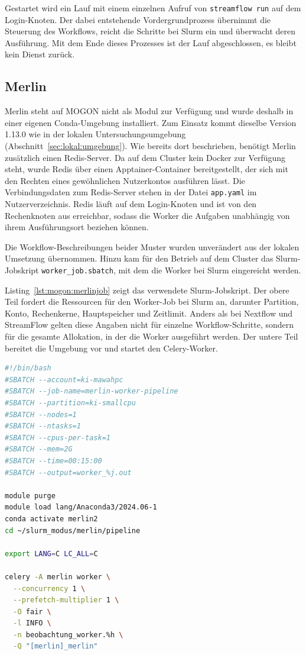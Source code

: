 Gestartet wird ein Lauf mit einem einzelnen Aufruf von
\texttt{streamflow run} auf dem Login-Knoten. Der dabei entstehende
Vordergrundprozess übernimmt die Steuerung des Workflows, reicht die
Schritte bei Slurm ein und überwacht deren Ausführung. Mit dem Ende
dieses Prozesses ist der Lauf abgeschlossen, es bleibt kein Dienst
zurück.

\subsection{Merlin}
\label{sec:mogon:merlin}

Merlin steht auf MOGON nicht als Modul zur Verfügung und wurde
deshalb in einer eigenen Conda-Umgebung installiert. Zum Einsatz
kommt dieselbe Version 1.13.0 wie in der lokalen
Untersuchungsumgebung (Abschnitt~\ref{sec:lokal:umgebung}). Wie
bereits dort beschrieben, benötigt Merlin zusätzlich einen
Redis-Server. Da auf dem Cluster kein Docker zur Verfügung steht,
wurde Redis über einen Apptainer-Container bereitgestellt, der sich
mit den Rechten eines gewöhnlichen Nutzerkontos ausführen lässt.
Die Verbindungsdaten zum Redis-Server stehen in der Datei
\texttt{app.yaml} im Nutzerverzeichnis. Redis läuft auf dem
Login-Knoten und ist von den Rechenknoten aus erreichbar, sodass die
Worker die Aufgaben unabhängig von ihrem Ausführungsort beziehen
können.

Die Workflow-Beschreibungen beider Muster wurden unverändert aus der
lokalen Umsetzung übernommen. Hinzu kam für den Betrieb auf dem
Cluster das Slurm-Jobskript \texttt{worker\_job.sbatch}, mit dem die
Worker bei Slurm eingereicht werden.

Listing~\ref{lst:mogon:merlinjob} zeigt das verwendete
Slurm-Jobskript. Der obere Teil fordert die Ressourcen für den
Worker-Job bei Slurm an, darunter Partition, Konto,
Rechenkerne, Hauptspeicher und Zeitlimit. Anders als bei Nextflow
und StreamFlow gelten diese Angaben nicht für einzelne
Workflow-Schritte, sondern für die gesamte Allokation, in der die
Worker ausgeführt werden. Der untere Teil bereitet die Umgebung vor
und startet den Celery-Worker.

\begin{lstlisting}[language=bash,
  caption={Jobskript zum Start der Merlin-Worker im regulären Slurm-Betrieb auf MOGON},
  label={lst:mogon:merlinjob}]
#!/bin/bash
#SBATCH --account=ki-mawahpc
#SBATCH --job-name=merlin-worker-pipeline
#SBATCH --partition=ki-smallcpu
#SBATCH --nodes=1
#SBATCH --ntasks=1
#SBATCH --cpus-per-task=1
#SBATCH --mem=2G
#SBATCH --time=00:15:00
#SBATCH --output=worker_%j.out

module purge
module load lang/Anaconda3/2024.06-1
conda activate merlin2
cd ~/slurm_modus/merlin/pipeline

export LANG=C LC_ALL=C

celery -A merlin worker \
  --concurrency 1 \
  --prefetch-multiplier 1 \
  -O fair \
  -l INFO \
  -n beobachtung_worker.%h \
  -Q "[merlin]_merlin"
\end{lstlisting}

